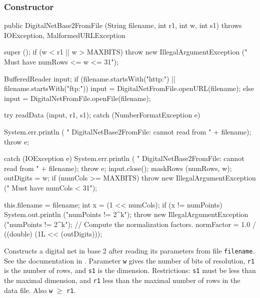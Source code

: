 \subsubsection* {Constructor}
\begin{code} 

   public DigitalNetBase2FromFile (String filename, int r1, int w, int s1) 
         throws IOException, MalformedURLException\begin{hide} 
   {
      super ();
      if (w < r1 || w > MAXBITS) 
         throw new IllegalArgumentException (" Must have numRows <= w <= 31");

      BufferedReader input;
      if (filename.startsWith("http:") || filename.startsWith("ftp:"))
         input = DigitalNetFromFile.openURL(filename);
      else
         input = DigitalNetFromFile.openFile(filename);

      try {
         readData (input, r1, s1);
      } catch (NumberFormatException e) {
         System.err.println (
            "   DigitalNetBase2FromFile:   cannot read from   " + filename);
         throw e;

      }  catch (IOException e) {
         System.err.println (
            "   DigitalNetBase2FromFile:  cannot read from  " + filename);
         throw e;
      }
      input.close();
      maskRows (numRows, w);
      outDigits = w;
      if (numCols >= MAXBITS) 
         throw new IllegalArgumentException (" Must have numCols < 31");

      this.filename = filename;
      int x = (1 << numCols);
      if (x != numPoints) {
         System.out.println ("numPoints != 2^k");
         throw new IllegalArgumentException ("numPoints != 2^k");
      }
      // Compute the normalization factors.  
      normFactor = 1.0 / ((double) (1L << (outDigits)));

  }\end{hide}
\end{code} 
\begin{tabb}
    Constructs a digital net in base 2 after reading its parameters from file
    {\texttt{filename}}. See the documentation in
  .
   Parameter \texttt{w} gives the number of bits of resolution, \texttt{r1} is
   the number of rows, and \texttt{s1} is the dimension.
   Restrictions: \texttt{s1} must be less than the maximal dimension, and
   \texttt{r1} less than the maximal number of rows in the data file.
   Also \texttt{w} $\ge$ \texttt{r1}.
\end{tabb}
